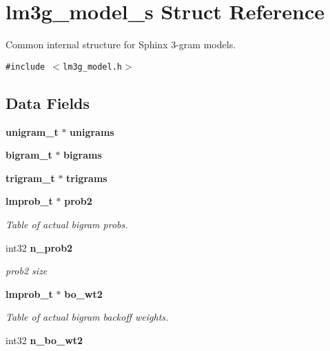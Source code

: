\section{lm3g\_\-model\_\-s Struct Reference}
\label{structlm3g__model__s}
Common internal structure for Sphinx 3-gram models.  


{\tt \#include $<$lm3g\_\-model.h$>$}

\subsection*{Data Fields}
\begin{CompactItemize}
\item 
{\bf unigram\_\-t} $\ast$ \textbf{unigrams}\label{structlm3g__model__s_94b4a80531261a20036cbc41b76b3f3a}

\item 
{\bf bigram\_\-t} $\ast$ \textbf{bigrams}\label{structlm3g__model__s_58e72d8dd17a928d1e150e95483092ca}

\item 
{\bf trigram\_\-t} $\ast$ \textbf{trigrams}\label{structlm3g__model__s_9d10497789f7406433bccae79db63b9f}

\item 
{\bf lmprob\_\-t} $\ast$ {\bf prob2}\label{structlm3g__model__s_34acf8c1ffaa4bb712ce1196eea59678}

\begin{CompactList}\small\item\em Table of actual bigram probs. \item\end{CompactList}\item 
int32 {\bf n\_\-prob2}\label{structlm3g__model__s_273e6ea4c39d1a563cc59f00b4b6ee98}

\begin{CompactList}\small\item\em prob2 size \item\end{CompactList}\item 
{\bf lmprob\_\-t} $\ast$ {\bf bo\_\-wt2}\label{structlm3g__model__s_7ee629aa1b8e88529127cf4da470d80f}

\begin{CompactList}\small\item\em Table of actual bigram backoff weights. \item\end{CompactList}\item 
int32 {\bf n\_\-bo\_\-wt2}\label{structlm3g__model__s_d4bbdd65d13712fe653afe8b1de9b096}


\end{CompactItemize}
